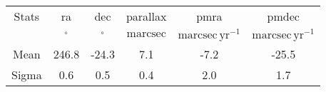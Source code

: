 \begin{table}
\begin{tabular}{cccccc}
Stats & ra & dec & parallax & pmra & pmdec \\
 & $\mathrm{{}^{\circ}}$ & $\mathrm{{}^{\circ}}$ & $\mathrm{marcsec}$ & $\mathrm{marcsec\,yr^{-1}}$ & $\mathrm{marcsec\,yr^{-1}}$ \\
Mean & 246.8 & -24.3 & 7.1 & -7.2 & -25.5 \\
Sigma & 0.6 & 0.5 & 0.4 & 2.0 & 1.7 \\
\end{tabular}
\end{table}
